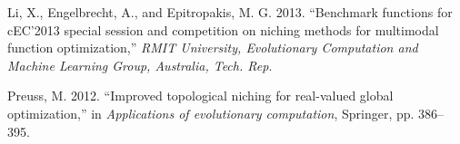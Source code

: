 \documentclass[12pt,a4paper]{article}
\begin{document}
\hypertarget{ref-liux5f2013}{}
Li, X., Engelbrecht, A., and Epitropakis, M. G. 2013. ``Benchmark
functions for cEC'2013 special session and competition on niching
methods for multimodal function optimization,'' \emph{RMIT University,
Evolutionary Computation and Machine Learning Group, Australia, Tech.
Rep}.

\hypertarget{ref-preussux5f2012}{}
Preuss, M. 2012. ``Improved topological niching for real-valued global
optimization,'' in \emph{Applications of evolutionary computation},
Springer, pp. 386--395.
\end{document}
